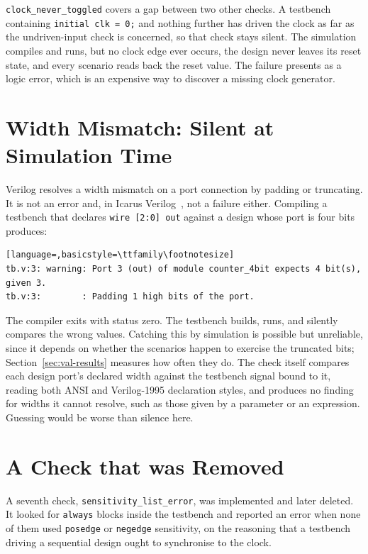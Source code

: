 \documentclass[11pt,a4paper,titlepage=false]{scrreprt}
\begin{document}
\texttt{clock\_never\_toggled} covers a gap between two other checks. A testbench
containing \texttt{initial clk = 0;} and nothing further has driven the clock as far as the
undriven-input check is concerned, so that check stays silent. The simulation compiles and
runs, but no clock edge ever occurs, the design never leaves its reset state, and every
scenario reads back the reset value. The failure presents as a logic error, which is an
expensive way to discover a missing clock generator.

\section{Width Mismatch: Silent at Simulation Time}\label{sec:loc-width}

Verilog resolves a width mismatch on a port connection by padding or truncating. It is not
an error and, in Icarus Verilog~\cite{iverilog}, not a failure either. Compiling a
testbench that declares \verb|wire [2:0] out| against a design whose port is four bits
produces:

\begin{lstlisting}[language=,basicstyle=\ttfamily\footnotesize]
tb.v:3: warning: Port 3 (out) of module counter_4bit expects 4 bit(s), given 3.
tb.v:3:        : Padding 1 high bits of the port.
\end{lstlisting}

The compiler exits with status zero. The testbench builds, runs, and silently compares the
wrong values. Catching this by simulation is possible but unreliable, since it depends on
whether the scenarios happen to exercise the truncated bits; Section~\ref{sec:val-results}
measures how often they do. The check itself compares each design port's declared width
against the testbench signal bound to it, reading both ANSI and Verilog-1995 declaration
styles, and produces no finding for widths it cannot resolve, such as those given by a
parameter or an expression. Guessing would be worse than silence here.

\section{A Check that was Removed}\label{sec:loc-removed}

A seventh check, \texttt{sensitivity\_list\_error}, was implemented and later deleted. It
looked for \texttt{always} blocks inside the testbench and reported an error when none of
them used \texttt{posedge} or \texttt{negedge} sensitivity, on the reasoning that a
testbench driving a sequential design ought to synchronise to the clock.
\end{document}
